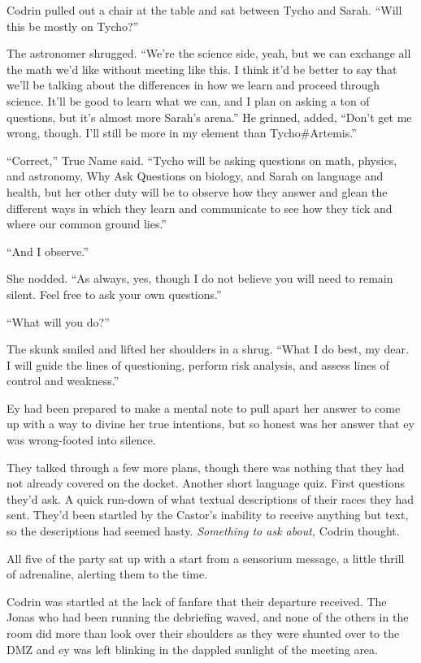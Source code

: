 Codrin pulled out a chair at the table and sat between Tycho and Sarah. ``Will this be mostly on Tycho?''

The astronomer shrugged. ``We're the science side, yeah, but we can exchange all the math we'd like without meeting like this. I think it'd be better to say that we'll be talking about the differences in how we learn and proceed through science. It'll be good to learn what we can, and I plan on asking a ton of questions, but it's almost more Sarah's arena.'' He grinned, added, ``Don't get me wrong, though. I'll still be more in my element than Tycho\#Artemis.''

``Correct,'' True Name said. ``Tycho will be asking questions on math, physics, and astronomy, Why Ask Questions on biology, and Sarah on language and health, but her other duty will be to observe how they answer and glean the different ways in which they learn and communicate to see how they tick and where our common ground lies.''

``And I observe.''

She nodded. ``As always, yes, though I do not believe you will need to remain silent. Feel free to ask your own questions.''

``What will you do?''

The skunk smiled and lifted her shoulders in a shrug. ``What I do best, my dear. I will guide the lines of questioning, perform risk analysis, and assess lines of control and weakness.''

Ey had been prepared to make a mental note to pull apart her answer to come up with a way to divine her true intentions, but so honest was her answer that ey was wrong-footed into silence.

They talked through a few more plans, though there was nothing that they had not already covered on the docket. Another short language quiz. First questions they'd ask. A quick run-down of what textual descriptions of their races they had sent. They'd been startled by the Castor's inability to receive anything but text, so the descriptions had seemed hasty. \emph{Something to ask about,} Codrin thought.

All five of the party sat up with a start from a sensorium message, a little thrill of adrenaline, alerting them to the time.

Codrin was startled at the lack of fanfare that their departure received. The Jonas who had been running the debriefing waved, and none of the others in the room did more than look over their shoulders as they were shunted over to the DMZ and ey was left blinking in the dappled sunlight of the meeting area.
